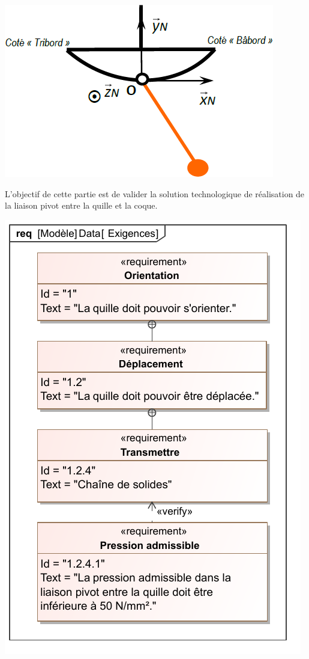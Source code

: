 \documentclass[10pt,fleqn]{article} %
\begin{document}
\begin{multicols}{2}
\begin{center}
\includegraphics[width=.8\linewidth]{images/fig_02}
\end{center}

\begin{obj}
L’objectif de cette partie est de valider la solution technologique de réalisation de la liaison pivot  entre la quille et la coque.
\end{obj}

\begin{center}
\includegraphics[width=.95\linewidth]{images/Exigences}
\end{center}


\end{multicols}
\end{document}
